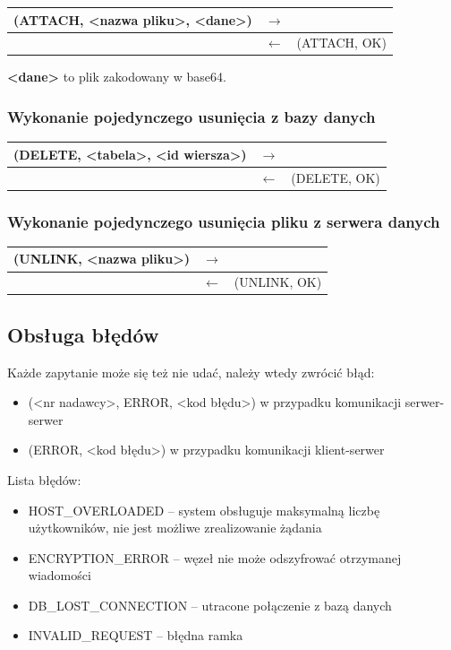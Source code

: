 \begin{longtable}{| p{} | p{}| p{} |} 
\hline
(ATTACH, <nazwa pliku>, <dane>) & $\rightarrow$ &  \\ \hline
 & $\leftarrow$ & (ATTACH, OK) \\ \hline
\end{longtable}
\textbf{<dane>} to plik zakodowany w base64.

\subsubsection{Wykonanie pojedynczego usunięcia z bazy danych}

\begin{longtable}{| p{} | p{}| p{} |} 
\hline
(DELETE, <tabela>, <id wiersza>) & $\rightarrow$ &  \\ \hline
 & $\leftarrow$ & (DELETE, OK) \\ \hline
\end{longtable}

\subsubsection{Wykonanie pojedynczego usunięcia pliku z serwera danych}

\begin{longtable}{| p{} | p{}| p{} |} 
\hline
(UNLINK, <nazwa pliku>) & $\rightarrow$ &  \\ \hline
 & $\leftarrow$ & (UNLINK, OK) \\ \hline
\end{longtable}

\subsection{Obsługa błędów}
Każde zapytanie może się też nie udać, należy wtedy zwrócić błąd:
\begin{itemize}
\item (<nr nadawcy>, ERROR, <kod błędu>) w przypadku komunikacji serwer-serwer
\item (ERROR, <kod błędu>) w przypadku komunikacji klient-serwer
\end{itemize}

Lista błędów:
\begin{itemize}
\item HOST\_OVERLOADED – system obsługuje maksymalną liczbę użytkowników, nie jest możliwe zrealizowanie żądania
\item ENCRYPTION\_ERROR – węzeł nie może odszyfrować otrzymanej wiadomości
\item DB\_LOST\_CONNECTION – utracone połączenie z bazą danych
\item INVALID\_REQUEST     – błędna ramka

\end{itemize}


